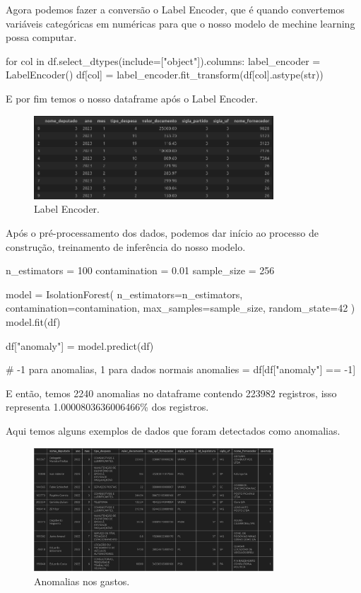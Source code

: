 \documentclass[12pt, a4paper]{article}
\begin{document}
Agora podemos fazer a conversão o Label Encoder, que é quando convertemos variáveis categóricas em numéricas para que o nosso modelo de mechine learning possa computar.

\begin{python}
for col in df.select_dtypes(include=["object"]).columns:
	label_encoder = LabelEncoder()
	df[col] = label_encoder.fit_transform(df[col].astype(str))
\end{python}

E por fim temos o nosso dataframe após o Label Encoder.

\begin{figure}[!htbp]
	\centering
	\includegraphics[width=0.8\textwidth]{assets/3_plot2.png}
	\caption{Label Encoder.}
	\label{fig:label encoder}
\end{figure}

Após o pré-processamento dos dados, podemos dar início ao processo de construção, treinamento de inferência do nosso modelo.

\begin{python}
n_estimators = 100
contamination = 0.01
sample_size = 256	

model = IsolationForest(
	n_estimators=n_estimators,
	contamination=contamination,
	max_samples=sample_size,
	random_state=42
)
model.fit(df)

df["anomaly"] = model.predict(df)

# -1 para anomalias, 1 para dados normais
anomalies = df[df["anomaly"] == -1]
\end{python}

E então, temos 2240 anomalias no dataframe contendo 223982 registros, isso representa 1.0000803636006466\% dos registros.

Aqui temos alguns exemplos de dados que foram detectados como anomalias.

\begin{figure}[!htbp]
	\centering
	\includegraphics[width=0.8\textwidth]{assets/3_plot3.png}
	\caption{Anomalias nos gastos.}
	\label{fig:anomalias}
\end{figure}
\end{document}
